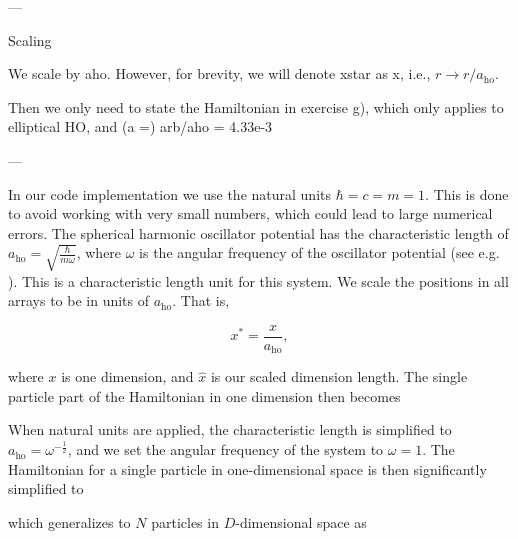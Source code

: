 ---

Scaling

We scale by aho. However, for brevity, we will denote xstar as x, i.e., $r \to r / a_\mathrm{ho}$.

Then we only need to state the Hamiltonian in exercise g), which only applies to elliptical HO, and (a =) arb/aho = 4.33e-3

---

In our code implementation we use the natural units $\hbar = c =  m = 1$. This is done to avoid working with very small numbers, which could lead to large numerical errors. 
The spherical harmonic oscillator potential has the characteristic length of $a_{\mathrm{ho}}=\sqrt{\frac{\hbar}{m\omega}}$, where $\omega$ is the angular frequency of the oscillator potential (see e.g. \cite{Dalfovo1999}). This is a characteristic length unit for this system. We scale the positions in all arrays to be in units of $a_{\mathrm{ho}}$. That is, 

\begin{equation*}
    x^* = \frac{x}{a_{\mathrm{ho}}}, 
\end{equation*}

where $x$ is one dimension, and $\hat{x}$ is our scaled dimension length. The single particle part of the Hamiltonian in one dimension then becomes


When natural units are applied, the characteristic length is simplified to $a_{\mathrm{ho}}=\omega^{-\frac{1}{2}}$, and we set the angular frequency of the system to $\omega=1$. The Hamiltonian for a single particle in one-dimensional space is then significantly simplified to 


which generalizes to $N$ particles in $D$-dimensional space as 


